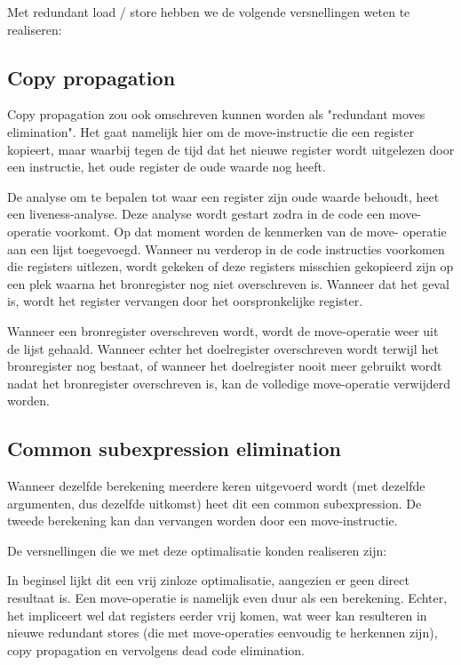 \documentclass[a4paper,10pt]{article}
\begin{document}
Met redundant load / store hebben we de volgende versnellingen weten te
realiseren:

\subsection{Copy propagation}
Copy propagation zou ook omschreven kunnen worden als "redundant moves
elimination". Het gaat namelijk hier om de move-instructie die een register 
kopieert, maar waarbij tegen de tijd dat het nieuwe register wordt 
uitgelezen door een instructie, het oude register de oude waarde nog heeft.

De analyse om te bepalen tot waar een register zijn oude waarde behoudt, 
heet een liveness-analyse. Deze analyse wordt gestart zodra in de code een
move-operatie voorkomt. Op dat moment worden de kenmerken van de move-
operatie aan een lijst toegevoegd. Wanneer nu verderop in de code 
instructies voorkomen die registers uitlezen, wordt gekeken of deze 
registers misschien gekopieerd zijn op een plek waarna het bronregister nog 
niet overschreven is. Wanneer dat het geval is, wordt het register vervangen
door het oorspronkelijke register.

Wanneer een bronregister overschreven wordt, wordt de move-operatie weer uit de
lijst gehaald. Wanneer echter het doelregister overschreven wordt terwijl het
bronregister nog bestaat, of wanneer het doelregister nooit meer gebruikt wordt
nadat het bronregister overschreven is, kan de volledige move-operatie
verwijderd worden.

\subsection{Common subexpression elimination}
Wanneer dezelfde berekening meerdere keren uitgevoerd wordt (met dezelfde
argumenten, dus dezelfde uitkomst) heet dit een common subexpression. De 
tweede berekening kan dan vervangen worden door een move-instructie.

De versnellingen die we met deze optimalisatie konden realiseren zijn:

In beginsel lijkt dit een vrij zinloze optimalisatie, aangezien er geen 
direct resultaat is. Een move-operatie is namelijk even duur als een
berekening. Echter, het impliceert wel dat registers eerder vrij komen, wat
weer kan resulteren in nieuwe redundant stores (die met move-operaties
eenvoudig te herkennen zijn), copy propagation en vervolgens dead code
elimination.
\end{document}
